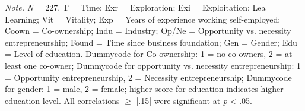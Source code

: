 \documentclass[man]{apa7}
\begin{document}
\begin{sidewaystable}[th]
\begin{tabular}{rlllllllllllllll}
\end{tabular}
\smallskip
\begin{tablenotes}
{\small
\textit{Note.} \textit{N} = 227. T = Time; Exr = Exploration; Exi = Exploitation; Lea = Learning; Vit = Vitality; Exp = Years of experience working self-employed; Coown = Co-ownership; Indu = Industry; Op/Ne = Opportunity vs. necessity entrepreneurship; Found = Time since business foundation; Gen = Gender; Edu = Level of education. Dummycode for Co-ownership: 1 = no co-owners, 2 = at least one co-owner; Dummycode for opportunity vs. necessity entrepreneurship: 1 = Opportunity entrepreneurship, 2 = Necessity entrepreneurship; Dummycode for gender: 1 = male, 2 = female; higher score for education indicates higher education level. All correlations $\geq$ |.15| were significant at \textit{p} < .05. 
}
\end{tablenotes}
\end{sidewaystable}
\end{document}

